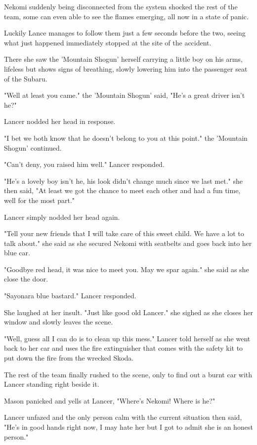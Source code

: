 Nekomi suddenly being disconnected from the system shocked the rest of the team, some can even able to see the flames emerging, all now in a state of panic.

Luckily Lance manages to follow them just a few seconds before the two, seeing what just happened immediately stopped at the site of the accident.

There she saw the 'Mountain Shogun' herself carrying a little boy on his arms, lifeless but shows signs of breathing, slowly lowering him into the passenger seat of the Subaru.

"Well at least you came." the 'Mountain Shogun' said, "He's a great driver isn't he?"

Lancer nodded her head in response.

"I bet we both know that he doesn't belong to you at this point." the 'Mountain Shogun' continued.

"Can't deny, you raised him well." Lancer responded.

"He's a lovely boy isn't he, his look didn't change much since we last met." she then said, "At least we got the chance to meet each other and had a fun time, well for the most part."

Lancer simply nodded her head again.

"Tell your new friends that I will take care of this sweet child. We have a lot to talk about." she said as she secured Nekomi with seatbelts and goes back into her blue car.

"Goodbye red head, it was nice to meet you. May we spar again." she said as she close the door.

"Sayonara blue bastard." Lancer responded.

She laughed at her insult. "Just like good old Lancer." she sighed as she closes her window and slowly leaves the scene.

"Well, guess all I can do is to clean up this mess." Lancer told herself as she went back to her car and uses the fire extinguisher that comes with the safety kit to put down the fire from the wrecked Skoda.

The rest of the team finally rushed to the scene, only to find out a burnt car with Lancer standing right beside it.

Mason panicked and yells at Lancer, "Where's Nekomi! Where is he?"

Lancer unfazed and the only person calm with the current situation then said, "He's in good hands right now, I may hate her but I got to admit she is an honest person."

